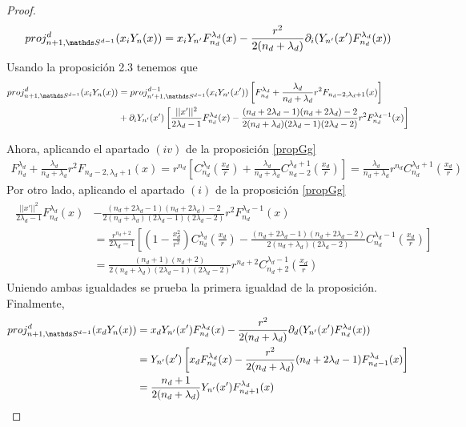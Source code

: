 \begin{proof}
	$$proj_{n+1,\sphere}^d(x_iY_n(x)) = x_iY_{n'} F_{n_d}^{\lambda_d}(x)-\frac{r^2}{2(n_d+\lambda_d)}\partial_i(Y_{n'}(x')F_{n_d}^{\lambda_d}(x))$$
	Usando la proposición 2.3 tenemos que
	\begin{gather*}
	\begin{aligned}
	proj_{n+1,\sphere}^d(x_iY_n(x)) &= proj_{n'+1,\sphere}^{d-1}(x_iY_{n'}(x'))\left[F_{n_d}^{\lambda_d}+\frac{\lambda_d}{n_d+\lambda_d}r^2F_{n_d-2,\lambda_d+1}(x)\right]\\&+\partial_iY_{n'}(x')\left[\frac{||x'||^2}{2\lambda_d-1}F_{n_d}^{\lambda_d}(x)-\frac{(n_d+2\lambda_d-1)(n_d+2\lambda_d)-2}{2(n_d+\lambda_d)(2\lambda_d-1)(2\lambda_d-2)}r^2F_{n_d}^{\lambda_d-1}(x)\right]
	\end{aligned}
	\end{gather*} 
	
	Ahora, aplicando el apartado $(iv)$ de la proposición \ref{propGg}
	\begin{gather*}
	F_{n_d}^{\lambda_d}+\frac{\lambda_d}{n_d+\lambda_d}r^2F_{n_d-2,\lambda_d+1}(x) = r^{n_d}\left[C_{n_d}^{\lambda_d}(\frac{x_d}{r})+\frac{\lambda_d}{n_d+\lambda_d}C_{n_d-2}^{\lambda_d+1}(\frac{x_d}{r})\right] = \frac{\lambda_d}{n_d+\lambda_d}r^{n_d}C_{n_d}^{\lambda_d+1}(\frac{x_d}{r})
	\end{gather*}
	Por otro lado, aplicando el apartado $(i)$ de la proposición \ref{propGg}
	\begin{gather*}
	\begin{aligned}
	\frac{||x'||^2}{2\lambda_d-1}F_{n_d}^{\lambda_d}(x)&-\frac{(n_d+2\lambda_d-1)(n_d+2\lambda_d)-2}{2(n_d+\lambda_d)(2\lambda_d-1)(2\lambda_d-2)}r^2F_{n_d}^{\lambda_d-1}(x) \\&= \frac{r^{n_d+2}}{2\lambda_d-1}\left[(1-\frac{x_d^2}{r^2})C_{n_d}^{\lambda_d}(\frac{x_d}{r})-\frac{(n_d+2\lambda_d-1)(n_d+2\lambda_d-2)}{2(n_d+\lambda_d)(2\lambda_d-2)}C_{n_d}^{\lambda_d - 1}(\frac{x_d}{r})\right] \\ &= \frac{(n_d+1)(n_d+2)}{2(n_d+\lambda_d)(2\lambda_d-1)(2\lambda_d-2)}r^{n_d+2}C_{n_d+2}^{\lambda_d-1}(\frac{x_d}{r})
	\end{aligned}
	\end{gather*}
	Uniendo ambas igualdades se prueba la primera igualdad de la proposición.
	\\Finalmente,
	\begin{gather*}
	\begin{aligned}
	proj_{n+1,\sphere}^d(x_dY_n(x)) &= x_dY_{n'}(x')F_{n_d}^{\lambda_d}(x)-\frac{r^2}{2(n_d+\lambda_d)}\partial_d(Y_{n'}(x')F_{n_d}^{\lambda_d}(x)) \\&=Y_{n'}(x')\left[x_dF_{n_d}^{\lambda_d}(x)-\frac{r^2}{2(n_d+\lambda_d)}(n_d+2\lambda_d-1)F_{n_d-1}^{\lambda_d}(x)\right] \\&= \frac{n_d+1}{2(n_d+\lambda_d)}Y_{n'}(x')F_{n_d+1}^{\lambda_d}(x)
	\end{aligned}
	\end{gather*}
\end{proof}
